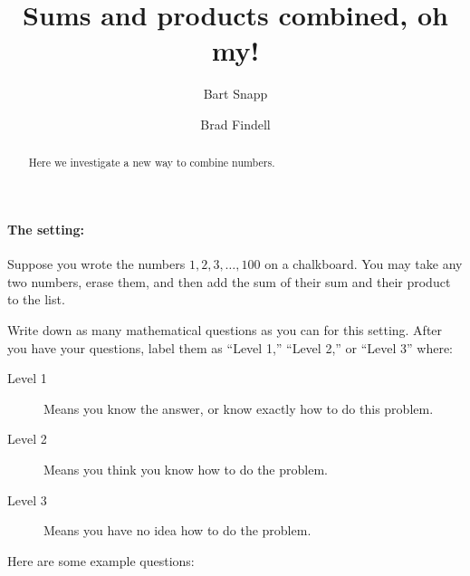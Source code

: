\documentclass[handout,nooutcomes]{ximera}
\title[Epilogue]{Sums and products combined, oh my!}
\author{Bart Snapp \and Brad Findell}
\begin{document}
\begin{abstract}
Here we investigate a new way to combine numbers.
\end{abstract}
\maketitle

\paragraph{The setting:}

Suppose you wrote the numbers $1,2,3,\dots,100$ on a chalkboard. You
may take any two numbers, erase them, and then add the sum of their
sum and their product to the list.

\begin{problem}
     Write down as many mathematical questions as you can for this
     setting. After you have your questions, label them as ``Level
     1,'' ``Level 2,'' or ``Level 3'' where:
\begin{description}
\item[Level 1] Means you know the answer, or know exactly how to do
  this problem.
\item[Level 2] Means you think you know how to do the problem.
\item[Level 3] Means you have no idea how to do the problem.
\end{description}
\begin{freeResponse}
  Here are some example questions:

\end{freeResponse}
\end{problem}
\end{document}

